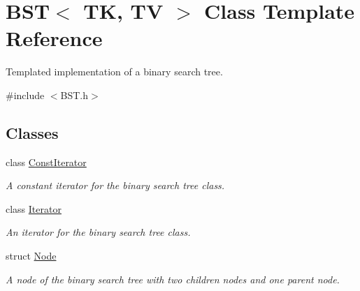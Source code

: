 \hypertarget{classBST}{}\section{B\+ST$<$ TK, TV $>$ Class Template Reference}
\label{classBST}


Templated implementation of a binary search tree.  




{\ttfamily \#include $<$B\+S\+T.\+h$>$}

\subsection*{Classes}
\begin{DoxyCompactItemize}
\item 
class \hyperlink{classBST_1_1ConstIterator}{Const\+Iterator}
\begin{DoxyCompactList}\small\item\em A constant iterator for the binary search tree class. \end{DoxyCompactList}\item 
class \hyperlink{classBST_1_1Iterator}{Iterator}
\begin{DoxyCompactList}\small\item\em An iterator for the binary search tree class. \end{DoxyCompactList}\item 
struct \hyperlink{structBST_1_1Node}{Node}
\begin{DoxyCompactList}\small\item\em A node of the binary search tree with two children nodes and one parent node. \end{DoxyCompactList}\end{DoxyCompactItemize}
